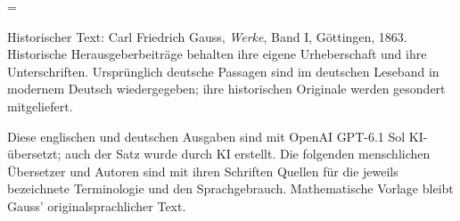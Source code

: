 \clearpage
\newcount\SavedTranslationPage
\SavedTranslationPage=\value{page}
\hypersetup{pageanchor=false}
\begingroup
\pagestyle{empty}\thispagestyle{empty}
\medskip
\small\raggedright
Historischer Text: Carl Friedrich Gauss, \emph{Werke}, Band I, Göttingen, 1863. Historische Herausgeberbeiträge behalten ihre eigene Urheberschaft und ihre Unterschriften. Ursprünglich deutsche Passagen sind im deutschen Leseband in modernem Deutsch wiedergegeben; ihre historischen Originale werden gesondert mitgeliefert.

Diese englischen und deutschen Ausgaben sind mit OpenAI GPT-6.1 Sol KI-übersetzt; auch der Satz wurde durch KI erstellt. Die folgenden menschlichen Übersetzer und Autoren sind mit ihren Schriften Quellen für die jeweils bezeichnete Terminologie und den Sprachgebrauch. Mathematische Vorlage bleibt Gauss' originalsprachlicher Text.

